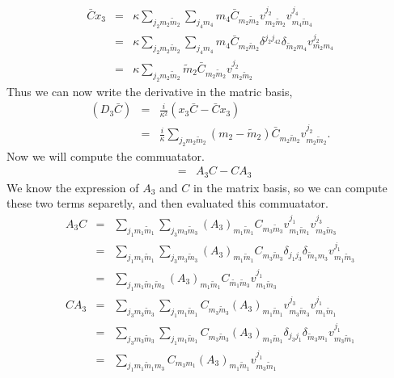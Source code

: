 \documentclass[a4paper,11pt]{article} %
\numberwithin{equation}{section} %
\numberwithin{figure}{section} %
\theoremstyle{plain} %
\theoremstyle{definition} %
\theoremstyle{remark} %
\begin{document}
\begin{eqnarray*}
 \bar{C}x_3 &=& \kappa \sum_{j_2 m_2 \tilde{m}_2} \sum_{j_4 m_4} m_4 \bar{C}_{m_2 \tilde{m}_2} v^{j_2}_{m_2 \tilde{m}_2} v^{j_4}_{m_4 \tilde{m}_4} \\
            &=& \kappa \sum_{j_2 m_2 \tilde{m}_2} \sum_{j_4 m_4} m_4 \bar{C}_{m_2 \tilde{m}_2} \delta^{j_2 j_42} \delta_{\tilde{m}_2 m_4} v^{j_2}_{m_2 m_4} \\
            &=& \kappa \sum_{j_2 m_2 \tilde{m}_2} \tilde{m}_2 \bar{C}_{m_2 \tilde{m}_2} v^{j_2}_{m_2 \tilde{m}_2}
\end{eqnarray*}
Thus we can now write the derivative in the matric basis,
\begin{eqnarray*}
 (D_3 \bar{C}) &=& \frac{i}{\kappa^2} (x_3\bar{C}-\bar{C}x_3) \\
               &=& \frac{i}{\kappa} \sum_{j_2 m_2 \tilde{m}_2} ( m_2 - \tilde{m}_2 ) \bar{C}_{m_2 \tilde{m}_2} v^{j_2}_{m_2 \tilde{m}_2}. 
\end{eqnarray*}
Now we will compute the commuatator.
\begin{eqnarray*}
 [A_3,C] &=& A_3 C - C A_3
\end{eqnarray*}
We know the expression of $A_3$ and $C$ in the matrix basis, so we can compute these two terms separetly, and then evaluated this commuatator.
\begin{eqnarray*}
 A_3 C &=& \sum_{j_1 m_1 \tilde{m}_1} \sum_{j_3 m_3 \tilde{m}_3} (A_3)_{m_1 \tilde{m}_1} C_{m_3 \tilde{m}_3} v^{j_1}_{m_1 \tilde{m}_1} v^{j_3}_{m_3 \tilde{m}_3} \\
       &=& \sum_{j_1 m_1 \tilde{m}_1} \sum_{j_3 m_3 \tilde{m}_3} (A_3)_{m_1 \tilde{m}_1} C_{m_3 \tilde{m}_3} \delta_{j_1 j_3} \delta_{\tilde{m}_1 m_3} v^{j_1}_{m_1 \tilde{m}_3} \\
       &=& \sum_{j_1 m_1 \tilde{m}_1 \tilde{m}_3} (A_3)_{m_1 \tilde{m}_1} C_{\tilde{m_1} \tilde{m}_3} v^{j_1}_{m_1 \tilde{m}_3} 
\end{eqnarray*}
\begin{eqnarray*}
 C A_3 &=& \sum_{j_3 m_3 \tilde{m}_3} \sum_{j_1 m_1 \tilde{m}_1}  C_{m_3 \tilde{m}_3} (A_3)_{m_1 \tilde{m}_1} v^{j_3}_{m_3 \tilde{m}_3} v^{j_1}_{m_1 \tilde{m}_1} \\
       &=& \sum_{j_3 m_3 \tilde{m}_3} \sum_{j_1 m_1 \tilde{m}_1}  C_{m_3 \tilde{m}_3} (A_3)_{m_1 \tilde{m}_1} \delta_{j_3 j_1} \delta_{\tilde{m}_3 m_1} v^{j_1}_{m_3 \tilde{m}_1} \\
       &=& \sum_{j_1 m_1 \tilde{m}_1 m_3} C_{m_3 m_1} (A_3)_{m_1 \tilde{m}_1} v^{j_1}_{m_3 \tilde{m}_1} 
\end{eqnarray*}
\end{document}
